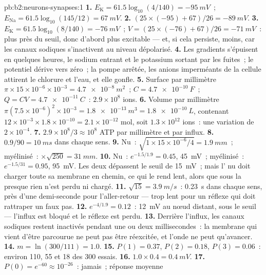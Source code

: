 \begin{solution}{pb:b2:neurons-synapses:1}
\textbf{1.} $E_{\mathrm K} = 61.5\log_{10}(4/140) = \qty{-95}{mV}$~;
$E_{\mathrm{Na}} = 61.5\log_{10}(145/12) = \qty{+67}{mV}$.
\textbf{2.} $(25\times(-95) + 67)/26 = \qty{-89}{mV}$.
\textbf{3.} $E_{\mathrm K} = 61.5\log_{10}(8/140) = \qty{-76}{mV}$~;
$V = (25\times(-76) + 67)/26 = \qty{-71}{mV}$~: plus près du seuil, donc
d'abord plus excitable --- et, si cela persiste, moins, car les canaux
sodiques s'inactivent au niveau dépolarisé.
\textbf{4.} Les gradients s'épuisent en quelques heures, le sodium
entrant et le potassium sortant par les fuites~; le potentiel dérive
vers zéro~; la pompe arrêtée, les anions imperméants de la cellule
attirent le chlorure et l'eau, et elle gonfle.
\textbf{5.} Surface par millimètre $\pi\times 15\times 10^{-6}\times
10^{-3} = \qty{4.7e-8}{m^2}$~; $C = \qty{4.7e-10}{F}$~; $Q = CV =
\qty{4.7e-11}{C}$~: $2.9\times 10^{8}$ ions.
\textbf{6.} Volume par millimètre $\pi(7.5\times 10^{-6})^{2}\times
10^{-3} = \qty{1.8e-13}{m^3} = \qty{1.8e-10}{L}$, contenant $12\times
10^{-3}\times 1.8\times 10^{-10} = 2.1\times 10^{-12}$ mol, soit $1.3\times
10^{12}$ ions~: une variation de $2\times 10^{-4}$.
\textbf{7.} $2.9\times 10^{8}/3 \approx 10^{8}$ ATP par millimètre et par
influx.
\textbf{8.} $0.9/90 = \qty{10}{ms}$ dans chaque sens.
\textbf{9.} Nu~: $\sqrt{1\times 15\times 10^{-6}/4} = \qty{1.9}{mm}$~;
myélinisé~: $\times\sqrt{250} = \qty{31}{mm}$.
\textbf{10.} Nu~: $e^{-1.5/1.9} = 0.45$, \qty{45}{mV}~; myélinisé~:
$e^{-1.5/31} = 0.95$, \qty{95}{mV}. Les deux dépassent le seuil de
\qty{15}{mV}~; mais l' nu doit charger toute sa membrane en chemin,
ce qui le rend lent, alors que sous la  presque rien n'est perdu
ni chargé.
\textbf{11.} $\sqrt{15} = \qty{3.9}{m/s}$~: \qty{0.23}{s} dans chaque sens,
près d'une demi-seconde pour l'aller-retour --- trop lent pour un réflexe
qui doit rattraper un faux pas.
\textbf{12.} $e^{-4/1.9} = 0.12$~: \qty{12}{mV} au nœud distant, sous le
seuil --- l'influx est bloqué et le réflexe est perdu.
\textbf{13.} Derrière l'influx, les canaux sodiques restent inactivés
pendant une ou deux millisecondes~: la membrane qui vient d'être
parcourue ne peut pas être réexcitée, et l'onde ne peut qu'avancer.
\textbf{14.} $m = \ln(300/111) = 1.0$.
\textbf{15.} $P(1) = 0.37$, $P(2) = 0.18$, $P(3) = 0.06$~: environ 110, 55
et 18 des 300 essais.
\textbf{16.} $1.0\times 0.4 = \qty{0.4}{mV}$.
\textbf{17.} $P(0) = e^{-60} \approx 10^{-26}$~: jamais~; réponse moyenne

\end{solution}
